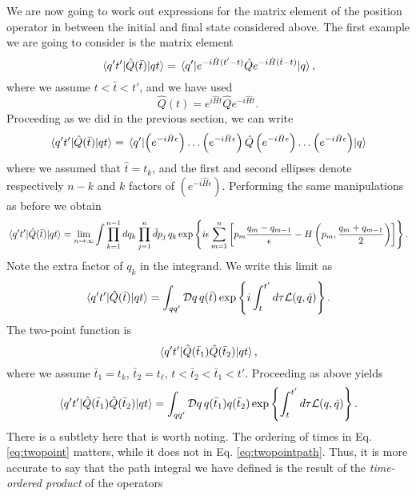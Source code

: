 \documentclass{article}
\numberwithin{equation}{section}
\begin{document}
We are now going to work out expressions for the matrix element of the position operator in between the initial and final state considered above. The first example we are going to consider is the matrix element
\begin{equation}
    \mel{q't'}{\hat{Q}(\bar{t})}{qt} = \mel{q'}{e^{-i\hat{H}(t'-t)}\hat{Q} e^{-i\hat{H}(\bar{t}-t)}}{q},
\end{equation}
where we assume $t < \bar{t} < t'$, and we have used
\begin{equation}
    \hat{Q}(t) = e^{i\hat{H}t} \hat{Q} e^{-i\hat{H}t}.
\end{equation}
Proceeding as we did in the previous section, we can write
\begin{equation}
    \mel{q't'}{\hat{Q}(\bar{t})}{qt} = \mel{q'}{\left(e^{-i\hat{H}\epsilon}\right) \dots \left(e^{-i\hat{H}\epsilon}\right) \hat{Q} \left(e^{-i\hat{H}\epsilon}\right) \dots \left(e^{-i\hat{H}\epsilon}\right)}{q}
\end{equation}
where we assumed that $\hat{t} = t_k$, and the first and second ellipses denote respectively $n-k$ and $k$ factors of $\left(e^{-i\hat{H}\epsilon}\right)$. Performing the same manipulations as before we obtain
\begin{equation}
    \mel{q't'}{\hat{Q}(\bar{t})}{qt} = \lim_{n\rightarrow \infty} \int \prod_{k=1}^{n-1} dq_k \prod_{j=1}^n \hat{d}p_j \, q_k \exp\left\{i\epsilon \sum_{m=1}^n \left[p_m \frac{q_m - q_{m-1}}{\epsilon} - H\left(p_m, \frac{q_m + q_{m-1}}{2}\right)\right]\right\}.
\end{equation}
Note the extra factor of $q_k$ in the integrand. We write this limit as 
\begin{equation}
    \mel{q't'}{\hat{Q}(\bar{t})}{qt} = \int_{qq'} \mathcal{D}q\, q(\bar{t}) \exp\left\{i \int_t^{t'} d\tau \mathcal{L}(q, \dot{q})\right\}.    
\end{equation}
The two-point function is 
\begin{equation} \label{eq:twopoint}
    \mel{q't'}{\hat{Q}(\bar{t}_1) \hat{Q}(\bar{t}_2)}{qt},
\end{equation}
where we assume $\bar{t}_1 = t_k$, $\bar{t}_2 = t_\ell$, $t < \bar{t}_2 <  \bar{t}_1 < t'$. Proceeding as above yields
\begin{equation} \label{eq:twopointpath}
    \mel{q't'}{\hat{Q}(\bar{t}_1) \hat{Q}(\bar{t}_2)}{qt} = \int_{qq'}\mathcal{D}q \, q(\bar{t}_1) q(\bar{t}_2) \exp\left\{\int_t^{t'} d\tau \mathcal{L}(q, \dot{q})\right\}.
\end{equation}
There is a subtlety here that is worth noting. The ordering of times in Eq. \ref{eq:twopoint} matters, while it does not in Eq. \ref{eq:twopointpath}. Thus, it is more accurate to say that the path integral we have defined is the result of the \textit{time-ordered product} of the operators
\end{document}
